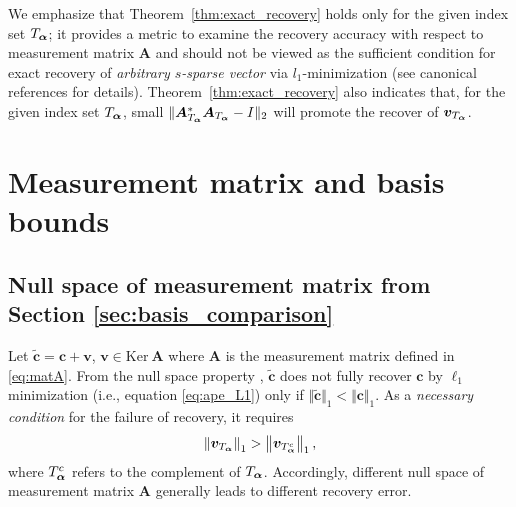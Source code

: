 \begin{rem}
  We emphasize that Theorem~\ref{thm:exact_recovery} holds only for the given index set $T_{\bm\alpha}$; it provides a metric to examine the recovery accuracy with respect to measurement matrix $\bm A$ and should not be viewed as the sufficient condition for exact recovery of \emph{arbitrary $s$-sparse vector} via $l_1$-minimization (see canonical references \cite{Candes_2005Decoding, Candes_2006Stablesrec,Rauhut_2010CsSM} for details). 
  Theorem~\ref{thm:exact_recovery} also indicates that, for the given index set $T_{\bm\alpha}$, small $\|\bm{A}^*_{T_{\bm\alpha}}\bm{A}_{T_{\bm\alpha}}-I\|_2$ will promote the recover of $\bm v_{T_{\bm\alpha}}$.
\end{rem}

\section{Measurement matrix and basis bounds}\label{app:basis_bound}
\subsection{Null space of measurement matrix from Section \ref{sec:basis_comparison}}
Let $\tilde{\bm c} = \bm c + \bm v$, $\bm v \in \textrm{Ker}~\bm{A}$ where $\bm{A}$ is the measurement matrix defined in \eqref{eq:matA}. 
From the null space property \cite{Rauhut_2010CsSM}, $\tilde{\bm c}$ does not fully recover $\bm c$ by 
$\ell_1$ minimization (i.e., equation \eqref{eq:ape_L1}) only if $\Vert  \tilde{\bm c} \Vert_1 < \Vert \bm c\Vert_1$. As a \emph{necessary 
condition} for the failure of recovery, it requires 
\begin{equation}
\left \Vert \bm v_{T_{\bm\alpha}}\right \Vert_1 > \left \Vert \bm v_{T_{\bm\alpha}^c}\right\Vert_1,
\label{eq:l1_failure}
\end{equation}  
where $T_{\bm\alpha}^c$ refers to the complement of $T_{\bm\alpha}$. Accordingly, different null space of measurement matrix $\bm{A}$ 
generally leads to different recovery error.

